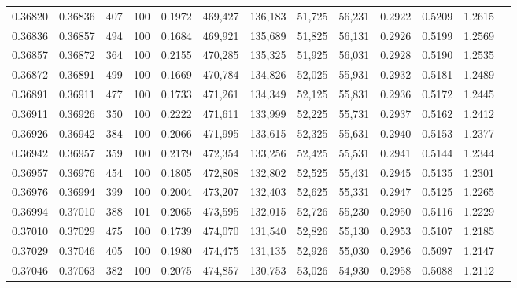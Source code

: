 \begin{tabular}{rrrrrrrrrrrrr}
0.36820 & 0.36836 &   407 & 100 &                                     0.1972 & 469,427 & 136,183 &  51,725 &  56,231 & 0.2922 & 0.5209 & 1.2615 \\
0.36836 & 0.36857 &   494 & 100 &                                     0.1684 & 469,921 & 135,689 &  51,825 &  56,131 & 0.2926 & 0.5199 & 1.2569 \\
0.36857 & 0.36872 &   364 & 100 &                                     0.2155 & 470,285 & 135,325 &  51,925 &  56,031 & 0.2928 & 0.5190 & 1.2535 \\
0.36872 & 0.36891 &   499 & 100 &                                     0.1669 & 470,784 & 134,826 &  52,025 &  55,931 & 0.2932 & 0.5181 & 1.2489 \\
0.36891 & 0.36911 &   477 & 100 &                                     0.1733 & 471,261 & 134,349 &  52,125 &  55,831 & 0.2936 & 0.5172 & 1.2445 \\
0.36911 & 0.36926 &   350 & 100 &                                     0.2222 & 471,611 & 133,999 &  52,225 &  55,731 & 0.2937 & 0.5162 & 1.2412 \\
0.36926 & 0.36942 &   384 & 100 &                                     0.2066 & 471,995 & 133,615 &  52,325 &  55,631 & 0.2940 & 0.5153 & 1.2377 \\
0.36942 & 0.36957 &   359 & 100 &                                     0.2179 & 472,354 & 133,256 &  52,425 &  55,531 & 0.2941 & 0.5144 & 1.2344 \\
0.36957 & 0.36976 &   454 & 100 &                                     0.1805 & 472,808 & 132,802 &  52,525 &  55,431 & 0.2945 & 0.5135 & 1.2301 \\
0.36976 & 0.36994 &   399 & 100 &                                     0.2004 & 473,207 & 132,403 &  52,625 &  55,331 & 0.2947 & 0.5125 & 1.2265 \\
0.36994 & 0.37010 &   388 & 101 &                                     0.2065 & 473,595 & 132,015 &  52,726 &  55,230 & 0.2950 & 0.5116 & 1.2229 \\
0.37010 & 0.37029 &   475 & 100 &                                     0.1739 & 474,070 & 131,540 &  52,826 &  55,130 & 0.2953 & 0.5107 & 1.2185 \\
0.37029 & 0.37046 &   405 & 100 &                                     0.1980 & 474,475 & 131,135 &  52,926 &  55,030 & 0.2956 & 0.5097 & 1.2147 \\
0.37046 & 0.37063 &   382 & 100 &                                     0.2075 & 474,857 & 130,753 &  53,026 &  54,930 & 0.2958 & 0.5088 & 1.2112 \\

\end{tabular}
